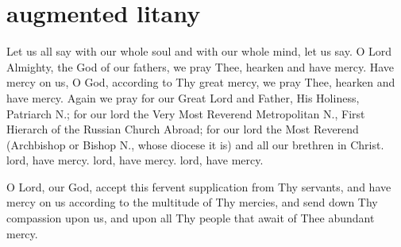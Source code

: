 \section{augmented litany}

\begin{liturgicaltext}
    \deacon Let us all say with our whole soul and with our whole mind, let us say.
    \choir {}
    \deacon O Lord Almighty, the God of our fathers, we pray Thee, hearken and have mercy.
    \choir {}
    \deacon Have mercy on us, O God, according to Thy great mercy, we pray Thee, hearken and have mercy.
    \choir {}\pagebreak
    \deacon Again we pray for our Great Lord and Father, His Holiness, Patriarch N.; for our lord the Very Most Reverend Metropolitan N., First Hierarch of the Russian Church Abroad; for our lord the Most Reverend (Archbishop or Bishop N., whose diocese it is) and all our brethren in Christ.
    \choirsemisecret lord, have mercy. lord, have mercy. lord, have mercy. 
\end{liturgicaltext}
\begin{semisecret}
    \begin{secretprayer}
        O Lord, our God, accept this fervent supplication from Thy servants, and have mercy on us according to the multitude of Thy mercies, and send down Thy compassion upon us, and upon all Thy people that await of Thee abundant mercy.
    \end{secretprayer}
\end{semisecret}
